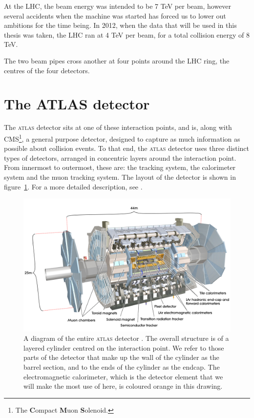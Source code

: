 At the LHC, the beam energy was intended to be 7 TeV per beam, however several accidents when the machine was started has forced us to lower out ambitions for the time being. In 2012, when the data that will be used in this thesis was taken, the LHC ran at 4 TeV per beam, for a total collision energy of 8 TeV.

The two beam pipes cross another at four points around the LHC ring, the centres of the four detectors.

\section{The ATLAS detector}
The \textsc{atlas} detector sits at one of these interaction points, and is, along with CMS\footnote{The \textbf{C}ompact \textbf{M}uon \textbf{S}olenoid.}, a general purpose detector, designed to capture as much information as possible about collision events. To that end, the \textsc{atlas} detector uses three distinct types of detectors, arranged in concentric layers around the interaction point. From innermost to outermost, these are: the tracking system, the calorimeter system and the muon tracking system. The layout of the detector is shown in figure~\ref{allatlas}. For a more detailed description, see \cite{detectorpaper}.

\begin{figure}[htp]
\begin{minipage}[b]{.69\textwidth}
\includegraphics[width=1\textwidth]{AllAtlasBig}
\end{minipage}
\begin{minipage}[b]{.3\textwidth}
\caption{A diagram of the entire \textsc{atlas} detector \cite{atlasweb}. The overall structure is of a layered cylinder centred on the interaction point. We refer to those parts of the detector that make up the wall of the cylinder as the barrel section, and to the ends of the cylinder as the endcap. The electromagnetic calorimeter, which is the detector element that we will make the most use of here, is coloured orange in this drawing.}
\end{minipage}
\label{allatlas}
\end{figure}

